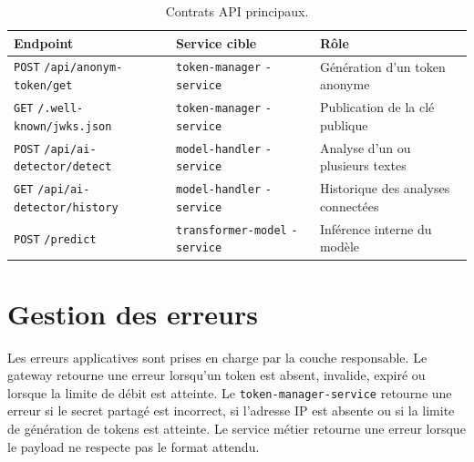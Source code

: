 ﻿\documentclass[12pt, a4paper]{report}
\begin{document}
\begin{table}[H]
\centering
\small
\renewcommand{\arraystretch}{1.45}
\begin{tabular}{p{}p{}p{}}
\toprule
\textbf{Endpoint} & \textbf{Service cible} & \textbf{Rôle} \\
\midrule
\texttt{POST} \newline \texttt{/api/anonym-token/get} & \texttt{token-manager} \newline \texttt{-service} & Génération d'un token anonyme \\
\texttt{GET} \newline \texttt{/.well-known/jwks.json} & \texttt{token-manager} \newline \texttt{-service} & Publication de la clé publique \\
\texttt{POST} \newline \texttt{/api/ai-detector/detect} & \texttt{model-handler} \newline \texttt{-service} & Analyse d'un ou plusieurs textes \\
\texttt{GET} \newline \texttt{/api/ai-detector/history} & \texttt{model-handler} \newline \texttt{-service} & Historique des analyses connectées \\
\texttt{POST} \newline \texttt{/predict} & \texttt{transformer-model} \newline \texttt{-service} & Inférence interne du modèle \\
\bottomrule
\end{tabular}
\caption{Contrats API principaux.}
\label{tab:endpoints}
\end{table}

\section{Gestion des erreurs}

Les erreurs applicatives sont prises en charge par la couche responsable. Le
gateway retourne une erreur lorsqu'un token est absent, invalide, expiré ou
lorsque la limite de débit est atteinte. Le \texttt{token-manager-service}
retourne une erreur si le secret partagé est incorrect, si l'adresse IP est
absente ou si la limite de génération de tokens est atteinte. Le service métier
retourne une erreur lorsque le payload ne respecte pas le format attendu.

\end{document}
